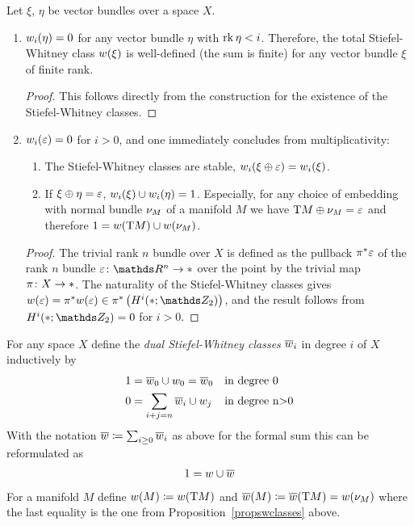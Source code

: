 \begin{Rem} %
  \label{propswclasses}
  Let $\xi$, $\eta$ be vector bundles over a space $X$.
  \begin{enumerate} 
  \item $w_i(\eta) = 0$
    for any vector bundle $\eta$ with $\operatorname{rk}\eta < i$.
    Therefore, the total Stiefel-Whitney class $w(\xi)$ is
    well-defined (\idest the sum is finite)
    for any vector bundle $\xi$ of finite rank.
    \begin{proof}
      This follows directly from the construction for the existence of
      the Stiefel-Whitney classes.
    \end{proof}
  \item $w_i(\varepsilon)=0$ for $i>0$, and one immediately concludes
    from multiplicativity:
    \begin{enumerate}
    \item The Stiefel-Whitney classes are stable, \idest
      $w_i(\xi\oplus\varepsilon) = w_i(\xi)$.
    \item If $\xi\oplus\eta = \varepsilon$, $w_i(\xi)\cup w_i(\eta)=1$.
      Especially, for any choice of embedding with normal bundle $\nu_{M}$
      of a manifold $M$ we have $\mathrm{T}M \oplus \nu_{M} = \varepsilon$ and
      therefore $1 = w(\mathrm{T}M) \cup w(\nu_{M})$.
    \end{enumerate}
    \begin{proof} %
      The trivial rank $n$ bundle over $X$ is defined as the pullback
      ${\pi}^* \varepsilon$ of the rank $n$ bundle
      $\trivbdl\colon \R^n\to\pt$ over the point by the trivial map
      $\pi\colon X\to*$. The naturality of the Stiefel-Whitney
      classes gives $\w(\trivbdl) = \pb\pi \w(\trivbdl)
      \in\pb\pi \left(H^i(\pt;\Zmod2)\right)$,
      and the result follows from $H^i(\pt;\Zmod2) = 0$ for $i>0$.
    \end{proof}
  \end{enumerate}
\end{Rem}

\begin{Def}
  For any space $X$ define the \emph{dual Stiefel-Whitney classes}
  $\overline{w}_i$ in degree $i$ of $X$ inductively by
  \begin{align*}
    1 &= \overline{w}_0\cup w_0 = \overline{w}_0    &&\text{in degree 0}\\
    0 &= \sum_{i+j=n} \overline{w}_i\cup w_j  &&\text{in degree n>0}
  \end{align*}
  With the notation $\overline{w}\coloneqq \sum_{i\geq0} \overline{w}_i$ as above
  for the formal sum this can be reformulated as
  \begin{gather*}
    1 = w\cup\overline{w}
  \end{gather*}
  For a manifold $M$ define
  $w(M) \coloneqq w(\mathrm{T}M)$ and
  $\overline{w}(M) \coloneqq \overline{w}(\mathrm{T}M) = w(\nu_{M})$
  where the last equality is the one from
  Proposition~\ref{propswclasses} above.
\end{Def}

